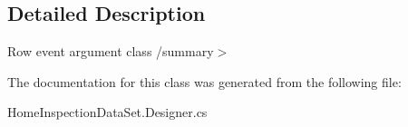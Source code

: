 \subsection{Detailed Description}
Row event argument class /summary$>$ 

The documentation for this class was generated from the following file\+:\begin{DoxyCompactItemize}
\item 
Home\+Inspection\+Data\+Set.\+Designer.\+cs\end{DoxyCompactItemize}
